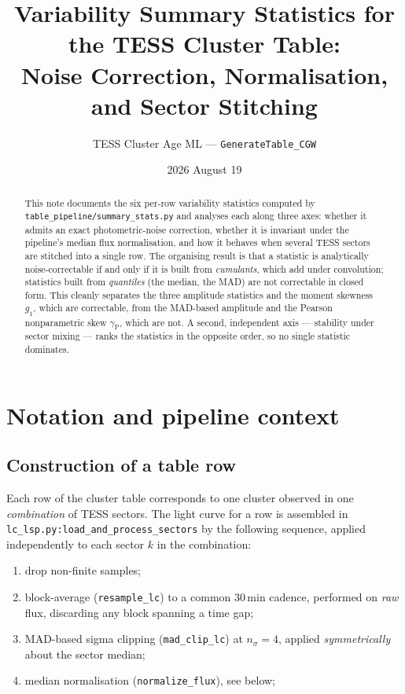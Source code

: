 \documentclass[11pt]{article}
\title{Variability Summary Statistics for the TESS Cluster Table:\\
       Noise Correction, Normalisation, and Sector Stitching}
\author{TESS Cluster Age ML --- \texttt{GenerateTable\_CGW}}
\date{2026 August 19}
\newcommand{\gp}{\gamma_{\mathrm{P}}}
\begin{document}
\maketitle

\begin{abstract}
This note documents the six per-row variability statistics computed by
\texttt{table\_pipeline/summary\_stats.py} and analyses each along three axes:
whether it admits an exact photometric-noise correction, whether it is invariant
under the pipeline's median flux normalisation, and how it behaves when several
TESS sectors are stitched into a single row. The organising result is that a
statistic is analytically noise-correctable if and only if it is built from
\emph{cumulants}, which add under convolution; statistics built from
\emph{quantiles} (the median, the MAD) are not correctable in closed form. This
cleanly separates the three amplitude statistics and the moment skewness
$g_1$, which are correctable, from the MAD-based amplitude and the Pearson
nonparametric skew $\gp$, which are not. A second, independent axis --- stability
under sector mixing --- ranks the statistics in the opposite order, so no single
statistic dominates.
\end{abstract}

\tableofcontents

\section{Notation and pipeline context}

\subsection{Construction of a table row}

Each row of the cluster table corresponds to one cluster observed in one
\emph{combination} of TESS sectors. The light curve for a row is assembled in
\texttt{lc\_lsp.py:load\_and\_process\_sectors} by the following sequence, applied
independently to each sector $k$ in the combination:

\begin{enumerate}
  \item drop non-finite samples;
  \item block-average (\texttt{resample\_lc}) to a common $30$\,min cadence,
        performed on \emph{raw} flux, discarding any block spanning a time gap;
  \item MAD-based sigma clipping (\texttt{mad\_clip\_lc}) at $n_\sigma = 4$,
        applied \emph{symmetrically} about the sector median;
  \item median normalisation (\texttt{normalize\_flux}), see below;
\end{enumerate}
\end{document}
